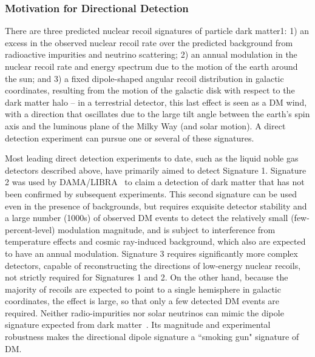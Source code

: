 \subsubsection{Motivation for Directional Detection}

There are three predicted nuclear recoil signatures of particle dark matter1: 1) an excess in the observed nuclear recoil rate over the predicted background from radioactive impurities and neutrino scattering; 2) an annual modulation in the nuclear recoil rate and energy spectrum due to the motion of the earth around the sun; and 3) a fixed dipole-shaped angular recoil distribution in galactic coordinates, resulting from the motion of the galactic disk with respect to the dark matter halo -- in a terrestrial detector, this last effect is seen as a DM wind, with a direction that oscillates due to the large tilt angle between the earth's spin axis and the luminous plane of the Milky Way (and solar motion).  A direct detection experiment can pursue one or several of these signatures.

Most leading direct detection experiments to date, such as the liquid noble gas detectors described above, have primarily aimed to detect Signature 1.  Signature 2 was used by DAMA/LIBRA~\cite{Bernabei:2019ajy} to claim a detection of dark matter that has not been confirmed by subsequent experiments.  This second signature can be used even in the presence of backgrounds, but requires exquisite detector stability and a large number (1000s) of observed DM events to detect the relatively small (few-percent-level) modulation magnitude, and is subject to interference from temperature effects and cosmic ray-induced background, which also are expected to have an annual modulation.  Signature 3 requires significantly more complex detectors, capable of reconstructing the directions of low-energy nuclear recoils, not strictly required for Signatures 1 and 2.  On the other hand, because the majority of recoils are expected to point to a single hemisphere in galactic coordinates, the effect is large, so that only a few detected DM events are required.  Neither radio-impurities nor solar neutrinos can mimic the dipole signature expected from dark matter~\cite{OHare:2015utx}.  Its magnitude and experimental robustness makes the directional dipole signature a ``smoking gun" signature of DM.

